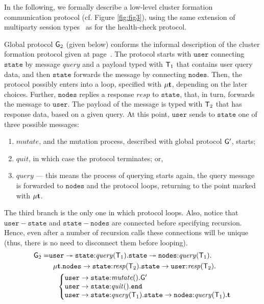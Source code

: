 In the following, we formally describe a low-level cluster formation communication protocol (cf. Figure \ref{fig:fig3}), using the same extension of multiparty session types~\cite{HuY17} as for the health-check protocol.

Global protocol ${\sf G}_2$ (given below) conforms the informal description of the cluster formation protocol given at page~\pageref{cluster_formation_informal_description}. 
The protocol starts with $\mathtt{user}$ connecting $\mathtt{state}$ by message $\mathit{query}$ and a payload typed with ${\mathsf T}_1$ that contains user query data, and  then $\mathtt{state}$ forwards the message by connecting $\mathtt{nodes}$. 
Then, the protocol possibly enters into a loop, specified with $\mu\textbf{t}$, depending on the later choices. 
Further, $\mathtt{nodes}$ replies a response $\mathit{resp}$ to $\mathtt{state}$, that, in turn, forwards the message to $\mathtt{user}$. The payload of the message is typed with ${\mathsf T}_2$ that has response data, based on a given query. 
At this point, $\mathtt{user}$  sends to $\mathtt{state}$ one of three possible messages:

\begin{enumerate}[start=1,label={(\bfseries \arabic*)}]
	\item $\mathit{mutate}$, and the mutation process, described with global protocol ${\sf G}'$, starts; 
	\item $\mathit{quit}$, in which case the protocol terminates; or,
	\item $\mathit{query}$ --- this means the process of querying starts again, the query message is forwarded to $\mathtt{nodes}$ and the protocol loops, returning to the point marked with $\mu\textbf{t}$.
\end{enumerate}

The third branch is the only one in which protocol loops. Also, notice that $\mathtt{user}-\mathtt{state}$ and $\mathtt{state}-\mathtt{nodes}$ are connected before specifying recursion. Hence, even after a number of recursion calls these connections will be unique (thus, there is no need to disconnect them before looping).   
\begin{align*}
\G_2 = & 
\mathtt{user} \twoheadrightarrow \mathtt{state}{:}\mathit{query}(\T_1).
\mathtt{state}\twoheadrightarrow \mathtt{nodes}{:}\mathit{query}(\T_1). \\
& \hspace{2mm}
\mu \ty.
\mathtt{nodes}\to \mathtt{state}{:}\mathit{resp}(\T_2).
\mathtt{state}\to\mathtt{user}{:}\mathit{resp}(\T_2). \\
& \hspace{4mm}
\left\{
\begin{array}{@{}l@{}}
\mathtt{user}\to\mathtt{state}{:} \mathit{mutate}().\G'\\
\mathtt{user}\to\mathtt{state}{:} \mathit{quit}().\tend\\
\mathtt{user}\to\mathtt{state}{:} \mathit{query}(\T_1).\mathtt{state}\to\mathtt{nodes}{:}\mathit{query}(\T_1).\ty
\end{array} \right.
\end{align*}

